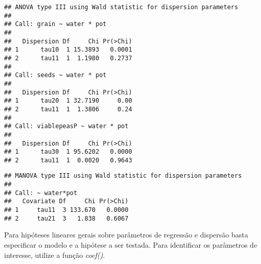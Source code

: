 \begin{knitrout}
\color{fgcolor}\begin{kframe}
\begin{alltt}
               \hlstd{=} \hlstd{(}\hlstd{(}\hlstd{,}\hlstd{),} \hlstd{(}\hlstd{,}\hlstd{),} \hlstd{(}\hlstd{,}\hlstd{)),}
               \hlstd{=} \hlstd{(}\hlstd{(}\hlstd{,} \hlstd{),}
                           \hlstd{(}\hlstd{,} \hlstd{),}
                           \hlstd{(}\hlstd{,} \hlstd{)))}
\end{alltt}
\begin{verbatim}
## ANOVA type III using Wald statistic for dispersion parameters
## 
## Call: grain ~ water * pot
## 
##   Dispersion Df     Chi Pr(>Chi)
## 1      tau10  1 15.3893   0.0001
## 2      tau11  1  1.1980   0.2737
## 
## Call: seeds ~ water * pot
## 
##   Dispersion Df     Chi Pr(>Chi)
## 1      tau20  1 32.7190     0.00
## 2      tau11  1  1.3806     0.24
## 
## Call: viablepeasP ~ water * pot
## 
##   Dispersion Df     Chi Pr(>Chi)
## 1      tau30  1 95.6202   0.0000
## 2      tau11  1  0.0020   0.9643
\end{verbatim}
\begin{alltt}
               \hlstd{=} \hlstd{(}\hlstd{,}\hlstd{),}
               \hlstd{=} \hlstd{(}\hlstd{,} \hlstd{))}
\end{alltt}
\begin{verbatim}
## MANOVA type III using Wald statistic for dispersion parameters
## 
## Call: ~ water*pot
##   Covariate Df     Chi Pr(>Chi)
## 1     tau11  3 133.670   0.0000
## 2     tau21  3   1.838   0.6067
\end{verbatim}
\end{kframe}
\end{knitrout}

Para hipóteses lineares gerais sobre parâmetros de regressão e dispersão basta especificar o modelo e a hipótese a ser testada. Para identificar os parâmetros de interesse, utilize a função \emph{coef()}.


